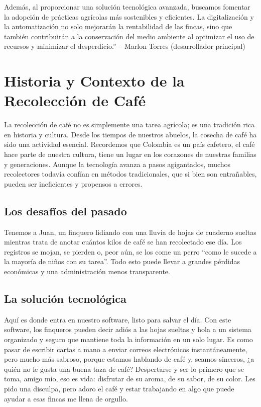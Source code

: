 \documentclass[12pt]{article}
\begin{document}
Además, al proporcionar una solución tecnológica avanzada, buscamos fomentar la adopción de prácticas agrícolas más sostenibles y eficientes. La digitalización y la automatización no solo mejorarán la rentabilidad de las fincas, sino que también contribuirán a la conservación del medio ambiente al optimizar el uso de recursos y minimizar el desperdicio.” – Marlon Torres (desarrollador principal)

\section{Historia y Contexto de la Recolección de Café}

La recolección de café no es simplemente una tarea agrícola; es una tradición rica en historia y cultura. Desde los tiempos de nuestros abuelos, la cosecha de café ha sido una actividad esencial. Recordemos que Colombia es un país cafetero, el café hace parte de nuestra cultura, tiene un lugar en los corazones de nuestras familias y generaciones. Aunque la tecnología avanza a pasos agigantados, muchos recolectores todavía confían en métodos tradicionales, que si bien son entrañables, pueden ser ineficientes y propensos a errores.

\subsection{Los desafíos del pasado}

Tenemos a Juan, un finquero lidiando con una lluvia de hojas de cuaderno sueltas mientras trata de anotar cuántos kilos de café se han recolectado ese día. Los registros se mojan, se pierden o, peor aún, se los come un perro “como le sucede a la mayoría de niños con su tarea”. Todo esto puede llevar a grandes pérdidas económicas y una administración menos transparente.

\subsection{La solución tecnológica}

Aquí es donde entra en nuestro software, listo para salvar el día. Con este software, los finqueros pueden decir adiós a las hojas sueltas y hola a un sistema organizado y seguro que mantiene toda la información en un solo lugar. Es como pasar de escribir cartas a mano a enviar correos electrónicos instantáneamente, pero mucho más sabroso, porque estamos hablando de café y, seamos sinceros, ¿a quién no le gusta una buena taza de café? Despertarse y ser lo primero que se toma, amigo mío, eso es vida: disfrutar de su aroma, de su sabor, de su color. Les pido una disculpa, pero adoro el café y estar trabajando en algo que puede ayudar a esas fincas me llena de orgullo.
\end{document}
